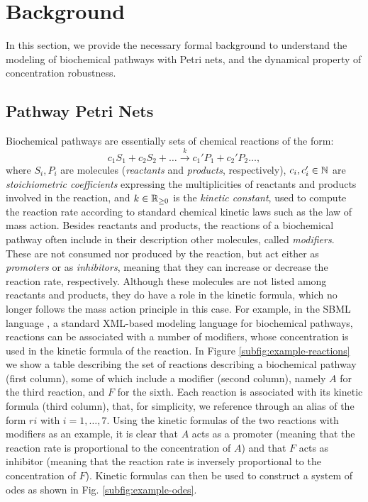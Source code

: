 \section{Background}\label{sect:background}
In this section, we provide the necessary formal background to understand the modeling of biochemical pathways with Petri nets, and the dynamical property of concentration robustness.

\subsection{Pathway Petri Nets}
Biochemical pathways are essentially sets of chemical reactions of the form:
\[
c_1 S_1 + c_2 S_2 + \ldots
\xrightarrow{k}
c_1' P_1 + c_2' P_2 \ldots,
\]
where $S_i,P_i$ are molecules (\emph{reactants} and \emph{products}, respectively), $c_i, c_i' \in \mathbb{N}$ are \emph{stoichiometric coefficients} expressing the multiplicities of reactants and products involved in the reaction, and $k \in \mathbb{R}_{\geq 0}$ is the \emph{kinetic constant}, used to compute the reaction rate according to standard chemical kinetic laws such as the law of mass action. Besides reactants and products, the reactions of a biochemical pathway often include in their description other molecules, called \emph{modifiers}. These are not consumed nor produced by the reaction, but act either as \emph{promoters} or as \emph{inhibitors}, meaning that they can increase or decrease the reaction rate, respectively. Although these molecules are not listed among reactants and products, they do have a role in the kinetic formula, which no longer follows the mass action principle in this case. For example, in the SBML language \citep{?}, a standard XML-based modeling language for biochemical pathways, reactions can be associated with a number of modifiers, whose concentration is used in the kinetic formula of the reaction. In Figure \ref{subfig:example-reactions} we show a table describing the set of reactions describing a biochemical pathway (first column), some of which include a modifier (second column), namely $A$ for the third reaction, and $F$ for the sixth. Each reaction is associated with its kinetic formula (third column), that, for simplicity, we reference through an alias of the form $ri$ with $i = 1, \ldots, 7$. Using the kinetic formulas of the two reactions with modifiers as an example, it is clear that $A$ acts as a promoter (meaning that the reaction rate is proportional to the concentration of $A$) and that $F$ acts as inhibitor (meaning that the reaction rate is inversely proportional to the concentration of $F$). Kinetic formulas can then be used to construct a system of \glspl{ode} as shown in Fig. \ref{subfig:example-odes}.

